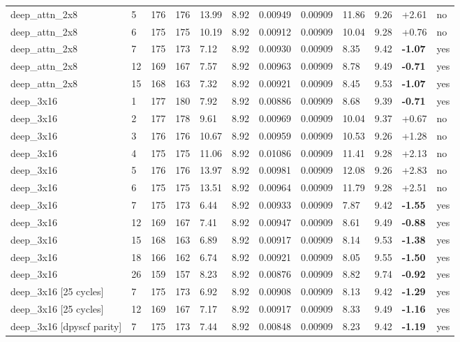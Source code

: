 \documentclass[10pt,a4paper]{article}
\begin{document}
\begin{landscape}
\begin{scriptsize}
\begin{longtable}{llllllllllll}
deep\_attn\_2x8 & 5 & 176 & 176 & 13.99 & 8.92 & 0.00949 & 0.00909 & 11.86 & 9.26 & +2.61 & no \\
deep\_attn\_2x8 & 6 & 175 & 175 & 10.19 & 8.92 & 0.00912 & 0.00909 & 10.04 & 9.28 & +0.76 & no \\
deep\_attn\_2x8 & 7 & 175 & 173 & 7.12 & 8.92 & 0.00930 & 0.00909 & 8.35 & 9.42 & \textbf{-1.07} & yes \\
deep\_attn\_2x8 & 12 & 169 & 167 & 7.57 & 8.92 & 0.00963 & 0.00909 & 8.78 & 9.49 & \textbf{-0.71} & yes \\
deep\_attn\_2x8 & 15 & 168 & 163 & 7.32 & 8.92 & 0.00921 & 0.00909 & 8.45 & 9.53 & \textbf{-1.07} & yes \\
deep\_3x16 & 1 & 177 & 180 & 7.92 & 8.92 & 0.00886 & 0.00909 & 8.68 & 9.39 & \textbf{-0.71} & yes \\
deep\_3x16 & 2 & 177 & 178 & 9.61 & 8.92 & 0.00969 & 0.00909 & 10.04 & 9.37 & +0.67 & no \\
deep\_3x16 & 3 & 176 & 176 & 10.67 & 8.92 & 0.00959 & 0.00909 & 10.53 & 9.26 & +1.28 & no \\
deep\_3x16 & 4 & 175 & 175 & 11.06 & 8.92 & 0.01086 & 0.00909 & 11.41 & 9.28 & +2.13 & no \\
deep\_3x16 & 5 & 176 & 176 & 13.97 & 8.92 & 0.00981 & 0.00909 & 12.08 & 9.26 & +2.83 & no \\
deep\_3x16 & 6 & 175 & 175 & 13.51 & 8.92 & 0.00964 & 0.00909 & 11.79 & 9.28 & +2.51 & no \\
deep\_3x16 & 7 & 175 & 173 & 6.44 & 8.92 & 0.00933 & 0.00909 & 7.87 & 9.42 & \textbf{-1.55} & yes \\
deep\_3x16 & 12 & 169 & 167 & 7.41 & 8.92 & 0.00947 & 0.00909 & 8.61 & 9.49 & \textbf{-0.88} & yes \\
deep\_3x16 & 15 & 168 & 163 & 6.89 & 8.92 & 0.00917 & 0.00909 & 8.14 & 9.53 & \textbf{-1.38} & yes \\
deep\_3x16 & 18 & 166 & 162 & 6.74 & 8.92 & 0.00921 & 0.00909 & 8.05 & 9.55 & \textbf{-1.50} & yes \\
deep\_3x16 & 26 & 159 & 157 & 8.23 & 8.92 & 0.00876 & 0.00909 & 8.82 & 9.74 & \textbf{-0.92} & yes \\
deep\_3x16 [25 cycles] & 7 & 175 & 173 & 6.92 & 8.92 & 0.00908 & 0.00909 & 8.13 & 9.42 & \textbf{-1.29} & yes \\
deep\_3x16 [25 cycles] & 12 & 169 & 167 & 7.17 & 8.92 & 0.00917 & 0.00909 & 8.33 & 9.49 & \textbf{-1.16} & yes \\
deep\_3x16 [dpyscf parity] & 7 & 175 & 173 & 7.44 & 8.92 & 0.00848 & 0.00909 & 8.23 & 9.42 & \textbf{-1.19} & yes \\

\end{longtable}
\end{scriptsize}
\end{landscape}
\end{document}
